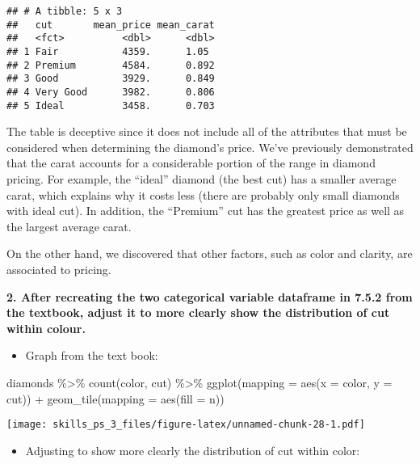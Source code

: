 \documentclass[
]{article}
\newenvironment{Shaded}{\begin{snugshade}}{\end{snugshade}}
\newcommand{\AttributeTok}[1]{\textcolor[rgb]{0.77,0.63,0.00}{#1}}
\newcommand{\FunctionTok}[1]{\textcolor[rgb]{0.00,0.00,0.00}{#1}}
\newcommand{\NormalTok}[1]{#1}
\newcommand{\SpecialCharTok}[1]{\textcolor[rgb]{0.00,0.00,0.00}{#1}}
\providecommand{\tightlist}{%
  \setlength{\itemsep}{0pt}\setlength{\parskip}{0pt}}
\begin{document}
\begin{verbatim}
## # A tibble: 5 x 3
##   cut       mean_price mean_carat
##   <fct>          <dbl>      <dbl>
## 1 Fair           4359.      1.05 
## 2 Premium        4584.      0.892
## 3 Good           3929.      0.849
## 4 Very Good      3982.      0.806
## 5 Ideal          3458.      0.703
\end{verbatim}

The table is deceptive since it does not include all of the attributes
that must be considered when determining the diamond's price. We've
previously demonstrated that the carat accounts for a considerable
portion of the range in diamond pricing. For example, the ``ideal''
diamond (the best cut) has a smaller average carat, which explains why
it costs less (there are probably only small diamonds with ideal cut).
In addition, the ``Premium'' cut has the greatest price as well as the
largest average carat.

On the other hand, we discovered that other factors, such as color and
clarity, are associated to pricing.

\textbf{2. After recreating the two categorical variable dataframe in
7.5.2 from the textbook, adjust it to more clearly show the distribution
of cut within colour.}

\begin{itemize}
\tightlist
\item
  Graph from the text book:
\end{itemize}

\begin{Shaded}
\begin{Highlighting}[]
\NormalTok{diamonds }\SpecialCharTok{\%\textgreater{}\%} 
  \FunctionTok{count}\NormalTok{(color, cut) }\SpecialCharTok{\%\textgreater{}\%}  
  \FunctionTok{ggplot}\NormalTok{(}\AttributeTok{mapping =} \FunctionTok{aes}\NormalTok{(}\AttributeTok{x =}\NormalTok{ color, }\AttributeTok{y =}\NormalTok{ cut)) }\SpecialCharTok{+}
    \FunctionTok{geom\_tile}\NormalTok{(}\AttributeTok{mapping =} \FunctionTok{aes}\NormalTok{(}\AttributeTok{fill =}\NormalTok{ n))}
\end{Highlighting}
\end{Shaded}

\texttt{[image: skills\_ps\_3\_files/figure-latex/unnamed-chunk-28-1.pdf]}

\begin{itemize}
\tightlist
\item
  Adjusting to show more clearly the distribution of cut within color:
\end{itemize}
\end{document}
